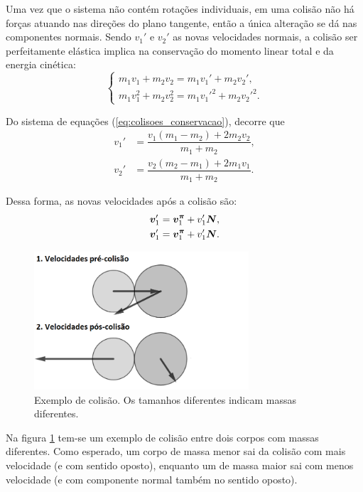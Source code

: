 Uma vez que o sistema não contém rotações individuais, em uma colisão não há forças atuando nas direções do plano tangente, então a única alteração se dá nas componentes normais. Sendo $v_1'$ e $v_2'$ as novas velocidades normais, a colisão ser perfeitamente elástica implica na conservação do momento linear total e da energia cinética:
\begin{equation}\label{eq:colisoes_conservacao}
    \begin{cases}
        m_1 v_1 + m_2 v_2 = m_1 v_1' + m_2 v_2', \\
        m_1 v_1^2 + m_2 v_2^2 = m_1 v_1'^2 + m_2 v_2'^2.
    \end{cases}
\end{equation}

Do sistema de equações (\ref{eq:colisoes_conservacao}), decorre que
\begin{align*}
    v_1' &= \dfrac{v_1 (m_1 - m_2) + 2 m_2 v_2}{m_1 + m_2}, \\
    v_2' &= \dfrac{v_2 (m_2 - m_1) + 2 m_1 v_1}{m_1 + m_2}.
\end{align*}

Dessa forma, as novas velocidades após a colisão são:
\begin{align*}
    \bm v_1' = \bm v_1^{\bm \pi} + v_1' \bm N, \\
    \bm v_1' = \bm v_1^{\bm \pi} + v_1' \bm N.
\end{align*}

\begin{figure}[H]
    \centering
    \includegraphics[width=8cm]{img/colisao_exemplo.png}
    \caption{Exemplo de colisão. Os tamanhos diferentes indicam massas diferentes.}
    \label{fig:colisao_exemplo}
\end{figure}

Na figura \ref{fig:colisao_exemplo} tem-se um exemplo de colisão entre dois corpos com massas diferentes. Como esperado, um corpo de massa menor sai da colisão com mais velocidade (e com sentido oposto), enquanto um de massa maior sai com menos velocidade (e com componente normal também no sentido oposto).